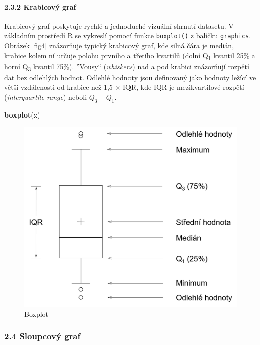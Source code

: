 \documentclass[12pt,]{article}
\newenvironment{Shaded}{\begin{snugshade}}{\end{snugshade}}
\newcommand{\KeywordTok}[1]{\textcolor[rgb]{0.13,0.29,0.53}{\textbf{#1}}}
\newcommand{\NormalTok}[1]{#1}
\let\oldparagraph\paragraph
\renewcommand{\paragraph}[1]{\oldparagraph{#1}\mbox{}}
\begin{document}
\newpage

\hypertarget{boxplot}{\paragraph{2.3.2 Krabicový graf}\label{boxplot}}

\qquad Krabicový graf poskytuje rychlé a jednoduché vizuální shrnutí
datasetu. V základním prostředí R se vykreslí pomocí funkce
\texttt{boxplot()} z balíčku \texttt{graphics}. Obrázek \ref{fig4}
znázorňuje typický krabicový graf, kde silná čára je medián, krabice
kolem ní určuje polohu prvního a třetího kvartilů (dolní
Q\textsubscript{1} kvantil 25\% a horní Q\textsubscript{3} kvantil
75\%). ''Vousy`` (\emph{whiskers}) nad a pod krabici znázorňují rozpětí
dat bez odlehlých hodnot. Odlehlé hodnoty jsou definovaný jako hodnoty
ležící ve větší vzdálenosti od krabice než 1,5 \(\times\) IQR, kde IQR
je mezikvartilové rozpětí (\emph{interquartile range}) neboli
\(Q_3 - Q_1\).

\begin{Shaded}
\begin{Highlighting}[]
\KeywordTok{boxplot}\NormalTok{(x)}
\end{Highlighting}
\end{Shaded}

\begin{figure}[H]

{\centering \includegraphics[width=0.65\linewidth]{fig/boxplot} 

}

\caption{\label{fig4} Boxplot}\label{fig:boxplot_img}
\end{figure}

\newpage

\subsubsection{2.4 Sloupcový graf}\label{sloupcovy-graf}
\end{document}

